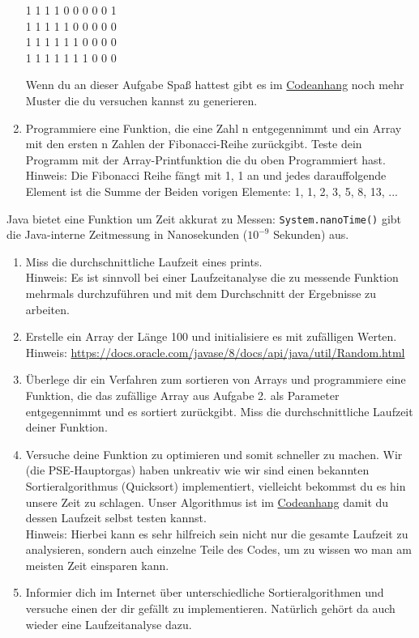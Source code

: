 \documentclass{../../sheet}
\begin{document}
\begin{enumerate}
\begin{ausgabe}
              1 1 1 1 0 0 0 0 0 1 \\
              1 1 1 1 1 0 0 0 0 0 \\
              1 1 1 1 1 1 0 0 0 0 \\
              1 1 1 1 1 1 1 0 0 0
          \end{ausgabe}
          Wenn du an dieser Aufgabe Spaß hattest gibt es im \hyperlink{Aufgabe_4}{Codeanhang} noch mehr Muster die du versuchen kannst zu generieren.
    \item Programmiere eine Funktion, die eine Zahl n entgegennimmt und ein Array mit den ersten n Zahlen der Fibonacci-Reihe zurückgibt. Teste dein Programm mit der Array-Printfunktion die du oben Programmiert hast.\\
          Hinweis: Die Fibonacci Reihe fängt mit 1, 1 an und jedes darauffolgende Element ist die Summe der Beiden vorigen Elemente: 1, 1, 2, 3, 5, 8, 13, ...

\end{enumerate}

\newpage
{}
Java bietet eine Funktion um Zeit akkurat zu Messen: \texttt{System.nanoTime()} gibt die Java-interne Zeitmessung in Nanosekunden ($10^{-9}$ Sekunden) aus.
\begin{enumerate}
    \item Miss die durchschnittliche Laufzeit eines prints.\\
    Hinweis: Es ist sinnvoll bei einer Laufzeitanalyse die zu messende Funktion mehrmals durchzuführen und mit dem Durchschnitt der Ergebnisse zu arbeiten.
    \item Erstelle ein Array der Länge 100 und initialisiere es mit zufälligen Werten. \\
          Hinweis: \url{https://docs.oracle.com/javase/8/docs/api/java/util/Random.html}
    \item Überlege dir ein Verfahren zum sortieren von Arrays und programmiere eine Funktion, die das zufällige Array aus Aufgabe 2. als Parameter entgegennimmt und es sortiert zurückgibt. Miss die durchschnittliche Laufzeit deiner Funktion.          
    \item Versuche deine Funktion zu optimieren und somit schneller zu machen. Wir (die PSE-Hauptorgas) haben unkreativ wie wir sind einen bekannten Sortieralgorithmus (Quicksort) implementiert, vielleicht bekommst du es hin unsere Zeit zu schlagen. Unser Algorithmus ist im \hyperlink{Highperformer}{Codeanhang} damit du dessen Laufzeit selbst testen kannst.\\
          Hinweis: Hierbei kann es sehr hilfreich sein nicht nur die gesamte Laufzeit zu analysieren, sondern auch einzelne Teile des Codes, um zu wissen wo man am meisten Zeit einsparen kann.
    \item Informier dich im Internet über unterschiedliche Sortieralgorithmen und versuche einen der dir gefällt zu implementieren. Natürlich gehört da auch wieder eine Laufzeitanalyse dazu.
\end{enumerate}
\end{document}
